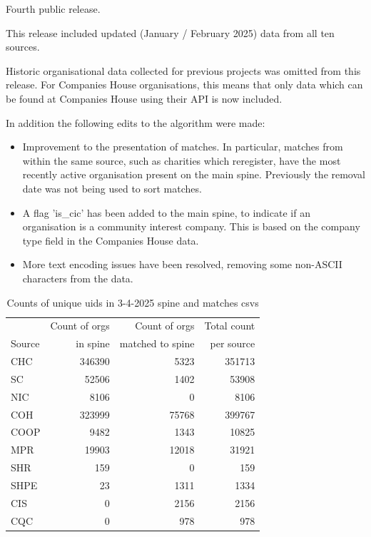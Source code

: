 \documentclass{article}
\begin{document}
Fourth public release. 

This release included updated (January / February 2025) data from all ten sources. 

Historic organisational data collected for previous projects was omitted from this release. 
For Companies House organisations, this means that only data which can be found at Companies House using their API is now included.

In addition the following edits to the algorithm were made:
\begin{itemize}
    \item Improvement to the presentation of matches. In particular, matches from within the same source, such as charities which reregister, have the most recently 
active organisation present on the main spine. Previously the removal date was not being used to sort matches.
 \item  A flag 'is\_cic' has been added to the main spine, to indicate if an organisation is a community interest company. This is based on the company type field in the Companies House data.
\item More text encoding issues have been resolved, removing some non-ASCII characters from the data.

\end{itemize}

\begin{table}[h]
    \centering
    \begin{tabular}{|l|r|r|r|}
        \hline
     & Count of orgs  & Count of orgs  & Total count\\
     Source &  in spine & matched to spine & per source\\ \hline \hline
    CHC & 346390 & 5323 & 351713\\ \hline
    SC & 52506 & 1402 & 53908\\ \hline
    NIC & 8106 & 0 & 8106\\ \hline
    COH & 323999 & 75768 & 399767\\ \hline
    COOP & 9482 & 1343 & 10825\\ \hline
    MPR & 19903 & 12018 & 31921\\ \hline
    SHR & 159 & 0 & 159\\ \hline
    SHPE & 23 & 1311 & 1334\\ \hline
    CIS & 0 & 2156 & 2156\\ \hline
    CQC & 0 & 978 & 978\\ \hline
    \end{tabular}
    \caption{Counts of unique uids in 3-4-2025 spine and matches csvs}
    \end{table}
\end{document}
